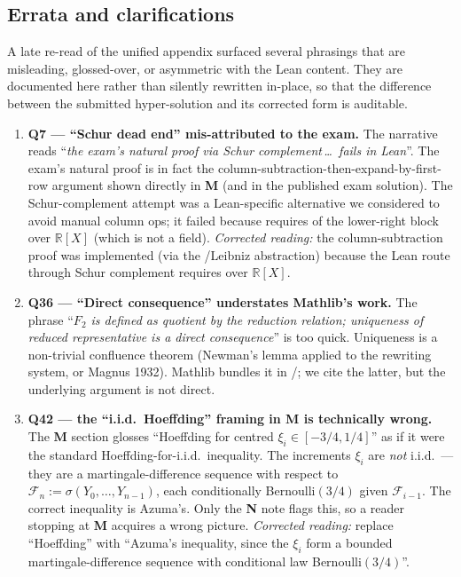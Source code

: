 \documentclass[11pt,a4paper]{article}
\newcommand{\R}{\mathbb{R}}
\theoremstyle{plain}
\theoremstyle{definition}
\begin{document}
\subsection{Errata and clarifications}\label{app:errata}

A late re-read of the unified appendix surfaced several phrasings
that are misleading, glossed-over, or asymmetric with the Lean
content. They are documented here rather than silently rewritten
in-place, so that the difference between the submitted hyper-solution
and its corrected form is auditable.

\begin{enumerate}[leftmargin=1.5em, label=\textbf{E\arabic*.}]

\item \textbf{Q7 --- ``Schur dead end'' mis-attributed to the exam.}
The narrative reads ``\emph{the exam's natural proof via Schur
complement\,\ldots\ fails in Lean}''. The exam's natural proof is
in fact the column-subtraction-then-expand-by-first-row argument
shown directly in \textbf{M} (and in the published exam solution).
The Schur-complement attempt was a Lean-specific alternative we
considered to avoid manual column ops; it failed because
 requires 
of the lower-right block over $\R[X]$ (which is not a field).
\emph{Corrected reading:} the column-subtraction proof was
implemented (via the /Leibniz abstraction) because
the Lean route through Schur complement requires 
over $\R[X]$.

\item \textbf{Q36 --- ``Direct consequence'' understates Mathlib's
work.} The phrase ``\emph{$F_2$ is defined as quotient by the
reduction relation; uniqueness of reduced representative is a
direct consequence}'' is too quick. Uniqueness is a non-trivial
confluence theorem (Newman's lemma applied to the rewriting
system, or Magnus 1932). Mathlib bundles it in
/;
we cite the latter, but the underlying argument is not direct.

\item \textbf{Q42 --- the ``i.i.d.\ Hoeffding'' framing in
\textbf{M} is technically wrong.} The \textbf{M} section glosses
``Hoeffding for centred $\xi_i \in [-3/4, 1/4]$'' as if it were the
standard Hoeffding-for-i.i.d.\ inequality. The increments
$\xi_i$ are \emph{not} i.i.d.\ --- they are a martingale-difference
sequence with respect to $\mathcal F_n := \sigma(Y_0, \ldots, Y_{n-1})$,
each conditionally Bernoulli$(3/4)$ given $\mathcal F_{i-1}$.
The correct inequality is Azuma's. Only the \textbf{N} note flags
this, so a reader stopping at \textbf{M} acquires a wrong picture.
\emph{Corrected reading:} replace ``Hoeffding'' with ``Azuma's
inequality, since the $\xi_i$ form a bounded martingale-difference
sequence with conditional law Bernoulli$(3/4)$''.


\end{enumerate}
\end{document}
